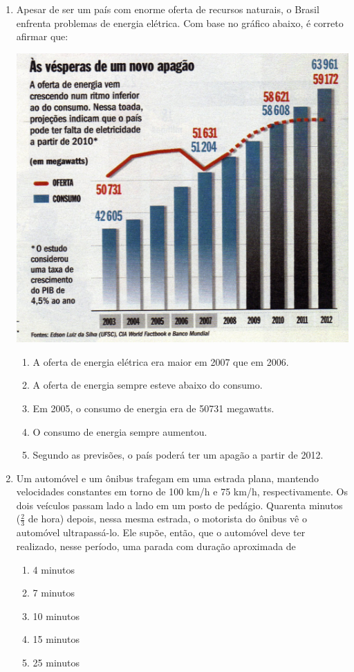 \documentclass[10pt,a4paper]{article}
\newenvironment{Figure}
  {\par\medskip\noindent\minipage{\linewidth}}
  {\endminipage\par\medskip}
\begin{document}
\begin{multicols}{2}
\begin{enumerate}
	\item Apesar de ser um pa\'is com enorme oferta de recursos naturais, o Brasil enfrenta problemas de energia el\'etrica. Com base no gr\'afico abaixo, \'e correto afirmar que:

\begin{Figure}
     \includegraphics[width=\linewidth]{apagao.jpg}
\end{Figure}


		\begin{enumerate}
		\item A oferta de energia el\'etrica era maior em 2007 que em 2006.
		\item A oferta de energia sempre esteve abaixo do consumo.
		\item Em 2005, o consumo de energia era de 50731 megawatts.
		\item O consumo de energia sempre aumentou.
		\item Segundo as previs\~oes, o pa\'is poder\'a ter um apag\~ao a partir de 2012.
		\end{enumerate}

	\item Um autom\'ovel e um \^onibus trafegam em uma estrada plana, mantendo velocidades constantes em torno de 100 km/h e 75 km/h, respectivamente. Os dois ve\'iculos passam lado a lado em um posto de ped\'agio. Quarenta minutos ($\frac{2}{3}$ de hora) depois, nessa mesma estrada, o motorista do \^onibus v\^e o autom\'ovel ultrapass\'a-lo. Ele sup\~oe, ent\~ao, que o autom\'ovel deve ter realizado, nesse per\'iodo, uma parada com dura\c{c}\~ao aproximada de
		\begin{enumerate}
		\item 4 minutos
		\item 7 minutos
		\item 10 minutos
		\item 15 minutos
		\item 25 minutos
		\end{enumerate}


\end{enumerate}
\end{multicols}
\end{document}
